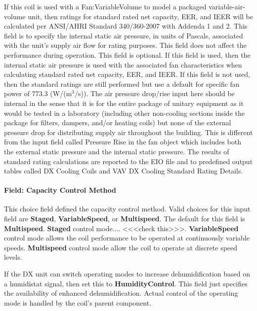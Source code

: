 If this coil is used with a Fan:VariableVolume to model a packaged variable-air-volume unit, then ratings for standard rated net capacity, EER, and IEER will be calculated per ANSI/AHRI Standard 340/360-2007 with Addenda 1 and 2. This field is to specify the internal static air pressure, in units of Pascals, associated with the unit's supply air flow for rating purposes. This field does not affect the performance during operation. This field is optional. If this field is used, then the internal static air pressure is used with the associated fan characteristics when calculating standard rated net capacity, EER, and IEER. If this field is not used, then the standard ratings are still performed but use a default for specific fan power of 773.3 (W/(m\(^{3}\)/s)). The air pressure drop/rise input here should be internal in the sense that it is for the entire package of unitary equipment as it would be tested in a laboratory (including other non-cooling sections inside the package for filters, dampers, and/or heating coils) but none of the external pressure drop for distributing supply air throughout the building. This is different from the input field called Pressure Rise in the fan object which includes both the external static pressure and the internal static pressure. The results of standard rating calculations are reported to the EIO file and to predefined output tables called DX Cooling Coils and VAV DX Cooling Standard Rating Details.

\paragraph{Field: Capacity Control Method}\label{field-capacity-control-method}

This choice field defined the capacity control method. Valid choices for this input field are \textbf{Staged}, \textbf{VariableSpeed}, or \textbf{Multispeed}. The default for this field is \textbf{Multispeed}. \textbf{Staged} control mode.... <<<check this>>>. \textbf{VariableSpeed} control mode allows the coil performance to be operated at continuously variable speeds. \textbf{Multispeed} control mode allow the coil to operate at discrete speed levels.

If the DX unit can switch operating modes to increase dehumidification based on a humidistat signal, then set this to \textbf{HumidityControl}. This field just specifies the availability of enhanced dehumidification. Actual control of the operating mode is handled by the coil's parent component.

